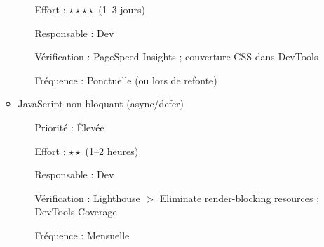 \documentclass[12pt,a4paper,twoside]{report}
\begin{document}
\begin{enumerate}
\begin{itemize}
\begin{itemize}
            \item[Effort :] $\star\star\star\star$ (1--3 jours)
            \item[Responsable :] Dev
            \item[Vérification :] PageSpeed Insights ; couverture CSS dans DevTools
            \item[Fréquence :] Ponctuelle (ou lors de refonte)
        \end{itemize}
        \item JavaScript non bloquant (async/defer)
        \begin{itemize}
            \item[Priorité :] Élevée
            \item[Effort :] $\star\star$ (1--2 heures)
            \item[Responsable :] Dev
            \item[Vérification :] Lighthouse $>$ Eliminate render-blocking resources ; DevTools Coverage
            \item[Fréquence :] Mensuelle
        \end{itemize}
    \end{itemize}


\end{enumerate}
\end{document}
